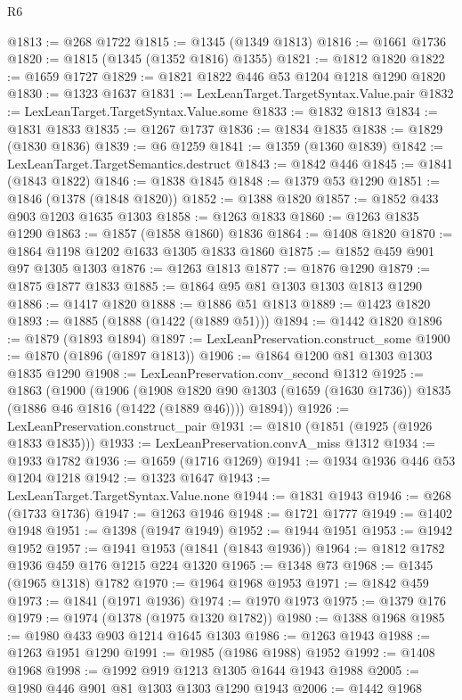 \begin{lexlean}{R6}
\begin{coremodule}
@1813 := @268 @1722
@1815 := @1345 (@1349 @1813)
@1816 := @1661 @1736
@1820 := @1815 (@1345 (@1352 @1816) @1355)
@1821 := @1812 @1820
@1822 := @1659 @1727
@1829 := @1821 @1822 @446 @53 @1204 @1218 @1290 @1820
@1830 := @1323 @1637
@1831 := LexLeanTarget.TargetSyntax.Value.pair
@1832 := LexLeanTarget.TargetSyntax.Value.some
@1833 := @1832 @1813
@1834 := @1831 @1833
@1835 := @1267 @1737
@1836 := @1834 @1835
@1838 := @1829 (@1830 @1836)
@1839 := @6 @1259
@1841 := @1359 (@1360 @1839)
@1842 := LexLeanTarget.TargetSemantics.destruct
@1843 := @1842 @446
@1845 := @1841 (@1843 @1822)
@1846 := @1838 @1845
@1848 := @1379 @53 @1290
@1851 := @1846 (@1378 (@1848 @1820))
@1852 := @1388 @1820
@1857 := @1852 @433 @903 @1203 @1635 @1303
@1858 := @1263 @1833
@1860 := @1263 @1835 @1290
@1863 := @1857 (@1858 @1860) @1836
@1864 := @1408 @1820
@1870 := @1864 @1198 @1202 @1633 @1305 @1833 @1860
@1875 := @1852 @459 @901 @97 @1305 @1303
@1876 := @1263 @1813
@1877 := @1876 @1290
@1879 := @1875 @1877 @1833
@1885 := @1864 @95 @81 @1303 @1303 @1813 @1290
@1886 := @1417 @1820
@1888 := @1886 @51 @1813
@1889 := @1423 @1820
@1893 := @1885 (@1888 (@1422 (@1889 @51)))
@1894 := @1442 @1820
@1896 := @1879 (@1893 @1894)
@1897 := LexLeanPreservation.construct_some
@1900 := @1870 (@1896 (@1897 @1813))
@1906 := @1864 @1200 @81 @1303 @1303 @1835 @1290
@1908 := LexLeanPreservation.conv_second @1312
@1925 := @1863
    (@1900
      (@1906
        (@1908 @1820 @90 @1303 (@1659 (@1630 @1736)) @1835 (@1886 @46 @1816 (@1422 (@1889 @46))))
        @1894))
@1926 := LexLeanPreservation.construct_pair
@1931 := @1810 (@1851 (@1925 (@1926 @1833 @1835)))
@1933 := LexLeanPreservation.convA_miss @1312
@1934 := @1933 @1782
@1936 := @1659 (@1716 @1269)
@1941 := @1934 @1936 @446 @53 @1204 @1218
@1942 := @1323 @1647
@1943 := LexLeanTarget.TargetSyntax.Value.none
@1944 := @1831 @1943
@1946 := @268 (@1733 @1736)
@1947 := @1263 @1946
@1948 := @1721 @1777
@1949 := @1402 @1948
@1951 := @1398 (@1947 @1949)
@1952 := @1944 @1951
@1953 := @1942 @1952
@1957 := @1941 @1953 (@1841 (@1843 @1936))
@1964 := @1812 @1782 @1936 @459 @176 @1215 @224 @1320
@1965 := @1348 @73
@1968 := @1345 (@1965 @1318) @1782
@1970 := @1964 @1968 @1953
@1971 := @1842 @459
@1973 := @1841 (@1971 @1936)
@1974 := @1970 @1973
@1975 := @1379 @176
@1979 := @1974 (@1378 (@1975 @1320 @1782))
@1980 := @1388 @1968
@1985 := @1980 @433 @903 @1214 @1645 @1303
@1986 := @1263 @1943
@1988 := @1263 @1951 @1290
@1991 := @1985 (@1986 @1988) @1952
@1992 := @1408 @1968
@1998 := @1992 @919 @1213 @1305 @1644 @1943 @1988
@2005 := @1980 @446 @901 @81 @1303 @1303 @1290 @1943
@2006 := @1442 @1968

\end{coremodule}
\end{lexlean}
